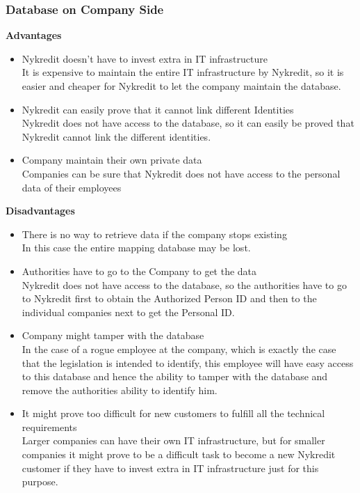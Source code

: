 \subsubsection{Database on Company Side}
\textbf{Advantages}
\begin{itemize}
	\item Nykredit doesn’t have to invest extra in IT infrastructure
	\\It is expensive to maintain the entire IT infrastructure by Nykredit, so it is easier and cheaper for Nykredit to let the company maintain the database.
	\item Nykredit can easily prove that it cannot link different Identities
	\\Nykredit does not have access to the database, so it can easily be proved that Nykredit cannot link the different identities.
	\item Company maintain their own private data
	\\Companies can be sure that Nykredit does not have access to the personal data of their employees
\end{itemize}
\textbf{Disadvantages}
\begin{itemize}
	
	\item There is no way to retrieve data if the company stops existing
	\\In this case the entire mapping database may be lost.
	\item Authorities have to go to the Company to get the data
	\\Nykredit does not have access to the database, so the authorities have to go to Nykredit first to obtain the Authorized Person ID and then to the individual companies next to get the Personal ID.
	\item Company might tamper with the database
	\\In the case of a rogue employee at the company, which is exactly the case that the legislation is intended to identify, this employee will have easy access to this database and hence the ability to tamper with the database and remove the authorities ability to identify him.
	\item It might prove too difficult for new customers to fulfill all the technical requirements 
	\\Larger companies can have their own IT infrastructure, but for smaller companies it might prove to be a difficult task to become a new Nykredit customer if they have to invest extra in IT infrastructure just for this purpose.
\end{itemize}

